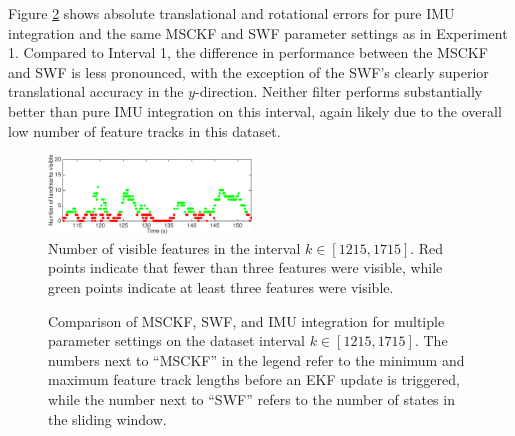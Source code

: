 \documentclass[letterpaper, 10 pt, conference]{ieeeconf}  %
\begin{document}
Figure \ref{fig:comp_2} shows absolute translational and rotational errors for pure IMU integration and the same MSCKF and SWF parameter settings as in Experiment 1.
Compared to Interval 1, the difference in performance between the MSCKF and SWF is less pronounced, with the exception of the SWF's clearly superior translational accuracy in the $y$-direction.
Neither filter performs substantially better than pure IMU integration on this interval, again likely due to the overall low number of feature tracks in this dataset.

\begin{figure}
    \centering
    \includegraphics[width=0.48\textwidth]{figs/nVisible_1215_1715}
    \caption{Number of visible features in the interval $k\in[1215,1715]$. Red points indicate that fewer than three features were visible, while green points indicate at least three features were visible.}
    \label{fig:nVisible_int2}
\end{figure}

\begin{figure}
    \centering


    \caption{Comparison of MSCKF, SWF, and IMU integration for multiple parameter settings on the dataset interval $k\in[1215,1715]$. The numbers next to ``MSCKF'' in the legend refer to the minimum and maximum feature track lengths before an EKF update is triggered, while the number next to ``SWF'' refers to the number of states in the sliding window.}
    \label{fig:comp_2}
\end{figure}
\end{document}
